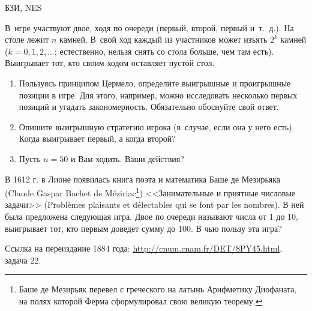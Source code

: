 \begin{problem}
\begin{source}
БЗИ, NES
\end{source} В~игре участвуют двое, ходя
по очереди (первый, второй, первый и~т.~д.). На столе лежит
$n$ камней. В~свой ход каждый из участников может изъять
$2^k$ камней ($k=0,1,2,\ldots$; естественно, нельзя снять
со стола больше, чем там есть). Выигрывает тот, кто своим
ходом оставляет пустой стол.

\begin{enumerate}

\item Пользуясь принципом Цермело, определите выигрышные и
проигрышные позиции в игре. Для этого, например, можно
исследовать несколько первых позиций и угадать
закономерность. Обязательно обоснуйте свой ответ.

\item Опишите выигрышную стратегию игрока (в~случае, если
она у него есть). Когда выигрывает первый, а когда второй?


\item Пусть $n=50$ и Вам ходить. Ваши действия?

\end{enumerate}







\begin{sol}

\end{sol}
\end{problem}




\begin{problem}
В 1612 г. в Лионе появилась книга поэта и математика Баше де Мезирьяка (Claude Gaspar Bachet de M\'eziriac\footnote{Баше де Мезирьяк перевел с греческого на латынь Арифметику Диофаната, на полях которой Ферма сформулировал свою великую теорему.}) <<Занимательные и приятные числовые задачи>> (Probl\`emes plaisants et d\'electables qui se font par les nombres). В ней была предложена следующая игра. Двое по очереди называют числа от 1 до 10, выигрывает тот, кто первым доведет сумму до 100. В чью пользу эта игра?\par
Ссылка на переиздание 1884 года: \url{http://cnum.cnam.fr/DET/8PY45.html}, задача 22.



\begin{sol}

\end{sol}
\end{problem}


